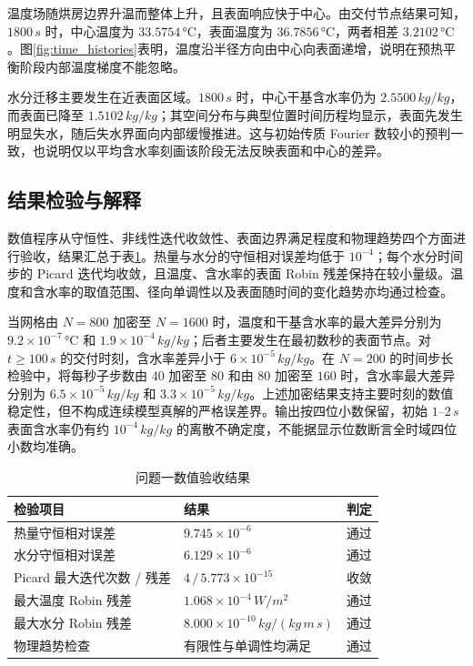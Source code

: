 \documentclass[withoutpreface,bwprint]{cumcmthesis}
\begin{document}
温度场随烘房边界升温而整体上升，且表面响应快于中心。由交付节点结果可知，$1800\,\si{s}$ 时，中心温度为 $33.5754\,\si{\celsius}$，表面温度为 $36.7856\,\si{\celsius}$，两者相差 $3.2102\,\si{\celsius}$。图\ref{fig:time_histories}表明，温度沿半径方向由中心向表面递增，说明在预热平衡阶段内部温度梯度不能忽略。

水分迁移主要发生在近表面区域。$1800\,\si{s}$ 时，中心干基含水率仍为 $2.5500\,\si{kg/kg}$，而表面已降至 $1.5102\,\si{kg/kg}$；其空间分布与典型位置时间历程均显示，表面先发生明显失水，随后失水界面向内部缓慢推进。这与初始传质 Fourier 数较小的预判一致，也说明仅以平均含水率刻画该阶段无法反映表面和中心的差异。

\subsection{结果检验与解释}

数值程序从守恒性、非线性迭代收敛性、表面边界满足程度和物理趋势四个方面进行验收，结果汇总于表\ref{tab:verification}。热量与水分的守恒相对误差均低于 $10^{-4}$；每个水分时间步的 Picard 迭代均收敛，且温度、含水率的表面 Robin 残差保持在较小量级。温度和含水率的取值范围、径向单调性以及表面随时间的变化趋势亦均通过检查。

当网格由 $N=800$ 加密至 $N=1600$ 时，温度和干基含水率的最大差异分别为 $9.2\times10^{-7}\,\si{\celsius}$ 和 $1.9\times10^{-4}\,\si{kg/kg}$；后者主要发生在最初数秒的表面节点。对 $t\geq100\,\si{s}$ 的交付时刻，含水率差异小于 $6\times10^{-5}\,\si{kg/kg}$。在 $N=200$ 的时间步长检验中，将每秒子步数由 $40$ 加密至 $80$ 和由 $80$ 加密至 $160$ 时，含水率最大差异分别为 $6.5\times10^{-5}\,\si{kg/kg}$ 和 $3.3\times10^{-5}\,\si{kg/kg}$。上述加密结果支持主要时刻的数值稳定性，但不构成连续模型真解的严格误差界。输出按四位小数保留，初始 $1$--$2\,\si{s}$ 表面含水率仍有约 $10^{-4}\,\si{kg/kg}$ 的离散不确定度，不能据显示位数断言全时域四位小数均准确。

\begin{table}[H]
\centering
\caption{问题一数值验收结果}
\label{tab:verification}
\begin{tabular}{lll}
\toprule[1.2pt]
检验项目 & 结果 & 判定 \\
\midrule
热量守恒相对误差 & $9.745\times10^{-6}$ & 通过 \\
水分守恒相对误差 & $6.129\times10^{-6}$ & 通过 \\
Picard 最大迭代次数 / 残差 & $4\,/\,5.773\times10^{-15}$ & 收敛 \\
最大温度 Robin 残差 & $1.068\times10^{-4}\,\si{W/m^2}$ & 通过 \\
最大水分 Robin 残差 & $8.000\times10^{-10}\,\si{kg/(kg\,m\,s)}$ & 通过 \\
物理趋势检查 & 有限性与单调性均满足 & 通过 \\
\bottomrule[1.2pt]
\end{tabular}
\end{table}
\end{document}
